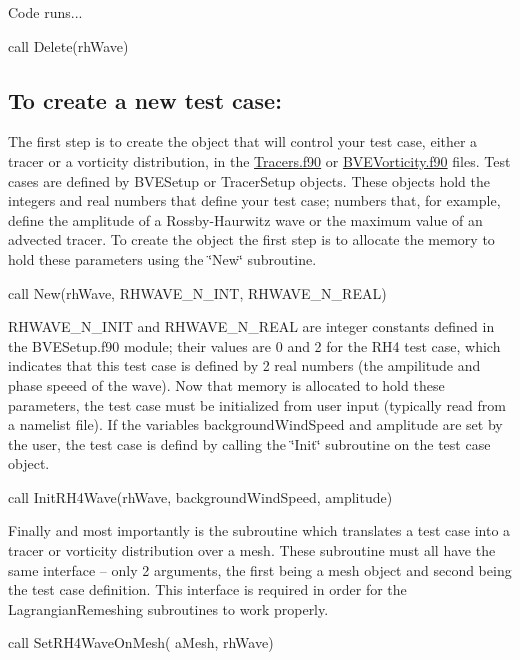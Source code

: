 Code runs... \begin{DoxyVerb}call Delete(rhWave) 
\end{DoxyVerb}


\subsection*{To create a new test case\+: }

The first step is to create the object that will control your test case, either a tracer or a vorticity distribution, in the \hyperlink{Tracers_8f90}{Tracers.\+f90} or \hyperlink{BVEVorticity_8f90}{B\+V\+E\+Vorticity.\+f90} files. Test cases are defined by B\+V\+E\+Setup or Tracer\+Setup objects. These objects hold the integers and real numbers that define your test case; numbers that, for example, define the amplitude of a Rossby-\/\+Haurwitz wave or the maximum value of an advected tracer. To create the object the first step is to allocate the memory to hold these parameters using the \char`\"{}\+New\char`\"{} subroutine. \begin{DoxyVerb}call New(rhWave, RHWAVE_N_INT, RHWAVE_N_REAL)
\end{DoxyVerb}


R\+H\+W\+A\+V\+E\+\_\+\+N\+\_\+\+I\+N\+I\+T and R\+H\+W\+A\+V\+E\+\_\+\+N\+\_\+\+R\+E\+A\+L are integer constants defined in the B\+V\+E\+Setup.\+f90 module; their values are 0 and 2 for the R\+H4 test case, which indicates that this test case is defined by 2 real numbers (the ampilitude and phase speeed of the wave). Now that memory is allocated to hold these parameters, the test case must be initialized from user input (typically read from a namelist file). If the variables background\+Wind\+Speed and amplitude are set by the user, the test case is defind by calling the \char`\"{}\+Init\char`\"{} subroutine on the test case object. \begin{DoxyVerb}call InitRH4Wave(rhWave, backgroundWindSpeed, amplitude)
\end{DoxyVerb}


Finally and most importantly is the subroutine which translates a test case into a tracer or vorticity distribution over a mesh. These subroutine must all have the same interface -- only 2 arguments, the first being a mesh object and second being the test case definition. This interface is required in order for the Lagrangian\+Remeshing subroutines to work properly. \begin{DoxyVerb}call SetRH4WaveOnMesh( aMesh, rhWave)
\end{DoxyVerb}



